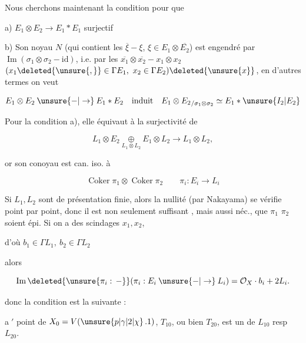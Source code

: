 

 Nous cherchons maintenant la condition pour que

a) $E_1\otimes E_2\longrightarrow E_1*E_1$ surjectif

b) Son noyau $N$ (qui contient les $\overline{\xi}-\xi$, $\xi\in E_1\otimes\overline{E_2}$) est engendré par  $\operatorname{Im}(\sigma_1\otimes\sigma_2-\mathrm{id})$, i.e. par les $\overline{x_1}\otimes\overline{x_2}-x_1\otimes x_2$ $(x_1\deleted{\unsure{,}}\in\Gamma E_1,\ x_2\in\Gamma E_2)\deleted{\unsure{x}}$,  en d'autres termes on veut

\[ E_1\otimes E_2\mathbin{\unsure{-|\to}}E_1*E_2\quad\text{induit}\quad {E_1\otimes E_2}_{/\sigma_1\otimes\sigma_2}\simeq E_1*\unsure{I_2|E_2} \]

 Pour la condition a), elle équivaut à la surjectivité de

\[ L_1\otimes E_2\underset{L_1\otimes L_2}{\oplus}E_1\otimes L_2\longrightarrow L_1\otimes L_2,\]

or son conoyau est can. iso. à

\[ \operatorname{Coker}\pi_1\otimes\operatorname{Coker}\pi_2\qquad \pi_i:E_i\longrightarrow L_i \]

Si $L_1,L_2$ sont de présentation finie, alors la nullité (par Nakayama) se vérifie point par point, donc il est non seulement suffisant , mais aussi néc., que  $\pi_1$  $\pi_2$ soient épi. Si on a des scindages $x_1,x_2$,

d'où \quad $b_1\in\Gamma L_1,\ b_2\in\Gamma L_2$

alors

\[ \operatorname{Im}\deleted{\unsure{\pi_i:\,-}}(\pi_i:E_i\mathbin{\unsure{-|\to}}L_i)=\mathcal{O}_X\cdot b_i+2L_i. \]

donc la condition est la suivante :


\textcircled{a$'$}   point de $X_0=V(\unsure{p|\gamma|2|\chi}\,.1)$,   $T_{10}$, ou bien $T_{20}$, est un   de $L_{10}$ resp $L_{20}$.
